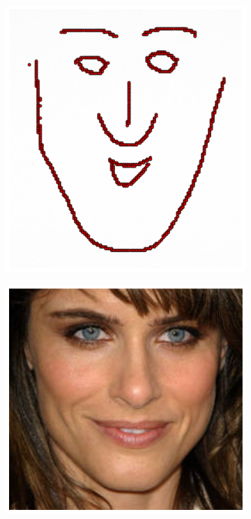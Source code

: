 \begin{figure}[h!]
    \centering
    \begin{subfigure}[b]{0.1\textwidth}
            \includegraphics[width=\textwidth]{resources/Fig_Draw/test_01}
    \end{subfigure}
    \hfill
    \begin{subfigure}[b]{0.12\textwidth}
            \includegraphics[width=\textwidth]{resources/Fig_Draw/test_01_base}

\end{subfigure}
\end{figure}
